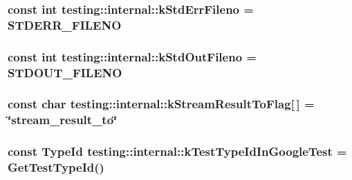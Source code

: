 \subsubsection[{\texorpdfstring{k\+Std\+Err\+Fileno}{kStdErrFileno}}]{\setlength{\rightskip}{0pt plus 5cm}const int testing\+::internal\+::k\+Std\+Err\+Fileno = S\+T\+D\+E\+R\+R\+\_\+\+F\+I\+L\+E\+NO}\hypertarget{namespacetesting_1_1internal_a747eccfdbdee3ff8af3bedc476a57c85}{}\label{namespacetesting_1_1internal_a747eccfdbdee3ff8af3bedc476a57c85}
\subsubsection[{\texorpdfstring{k\+Std\+Out\+Fileno}{kStdOutFileno}}]{\setlength{\rightskip}{0pt plus 5cm}const int testing\+::internal\+::k\+Std\+Out\+Fileno = S\+T\+D\+O\+U\+T\+\_\+\+F\+I\+L\+E\+NO}\hypertarget{namespacetesting_1_1internal_a24f0a3d50cac54a9132f4828ec9b96d9}{}\label{namespacetesting_1_1internal_a24f0a3d50cac54a9132f4828ec9b96d9}
\subsubsection[{\texorpdfstring{k\+Stream\+Result\+To\+Flag}{kStreamResultToFlag}}]{\setlength{\rightskip}{0pt plus 5cm}const char testing\+::internal\+::k\+Stream\+Result\+To\+Flag\mbox{[}$\,$\mbox{]} = \char`\"{}stream\+\_\+result\+\_\+to\char`\"{}}\hypertarget{namespacetesting_1_1internal_a84f8a2102d45c8b2b35be06d14ffefb8}{}\label{namespacetesting_1_1internal_a84f8a2102d45c8b2b35be06d14ffefb8}
\subsubsection[{\texorpdfstring{k\+Test\+Type\+Id\+In\+Google\+Test}{kTestTypeIdInGoogleTest}}]{\setlength{\rightskip}{0pt plus 5cm}const {\bf Type\+Id} testing\+::internal\+::k\+Test\+Type\+Id\+In\+Google\+Test = {\bf Get\+Test\+Type\+Id}()}\hypertarget{namespacetesting_1_1internal_acac7993efabbd9dd62c1e9c7d143a72f}{}\label{namespacetesting_1_1internal_acac7993efabbd9dd62c1e9c7d143a72f}
